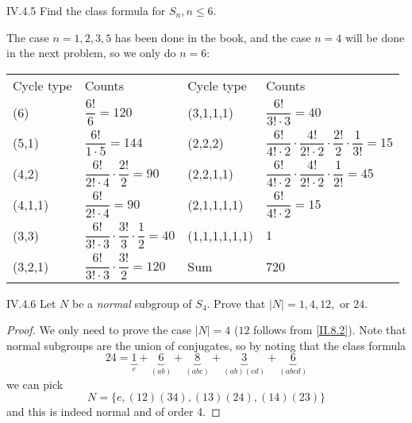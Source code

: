 \begin{problem}{IV.4.5}
Find the class formula for $S_n, n \leq 6$.
\end{problem}
\begin{solution}
The case $n = 1,2,3,5$ has been done in the book, and the case $n=4$ will be done in the next problem, so we only do $n = 6$:
\begin{center}
\begin{tabular}{l|l|l|l}
Cycle type & Counts &Cycle type & Counts \\
(6) & $\dfrac{6!}{6} = 120$ &(3,1,1,1) &$\dfrac{6!}{3! \cdot 3} = 40$ \\[8pt]
(5,1) &$\dfrac{6!}{1 \cdot 5} = 144$ & (2,2,2) &$\dfrac{6!}{4!\cdot 2} \cdot \dfrac{4!}{2!\cdot 2} \cdot \dfrac{2!}{2} \cdot \dfrac{1}{3!} = 15$ \\[8pt]
(4,2) &$\dfrac{6!}{2! \cdot 4} \cdot \dfrac{2!}{2} = 90$ &(2,2,1,1) &$\dfrac{6!}{4!\cdot 2} \cdot \dfrac{4!}{2!\cdot 2} \cdot \dfrac{1}{2!} = 45$ \\[8pt]
(4,1,1) &$\dfrac{6!}{2! \cdot 4} = 90$ &(2,1,1,1,1) &$\dfrac{6!}{4!\cdot 2} = 15$ \\[8pt]
(3,3) &$\dfrac{6!}{3! \cdot 3} \cdot \dfrac{3!}{3} \cdot \dfrac{1}{2} = 40$ &(1,1,1,1,1,1) &$1$ \\[8pt]
(3,2,1) &$\dfrac{6!}{3! \cdot 3} \cdot \dfrac{3!}{2} = 120$ &Sum &720

\end{tabular}	
\end{center}

\end{solution}

\begin{problem}{IV.4.6}
Let $N$ be a \emph{normal} subgroup of $S_4$. Prove that $|N| = 1,4,12,$ or $24$. 
\end{problem}
\begin{proof}
We only need to prove the case $|N|=4$ ($12$ follows from \ref{II.8.2}). Note that normal subgroups are the union of conjugates, so by noting that the class formula 
\[
24 = \underbrace{1}_e + \underbrace{6}_{(a b)} + \underbrace{8}_{(a b c)} + \underbrace{3}_{(a b)(c d)} + \underbrace{6}_{(a b c d)}
\]
we can pick
\[
N = \{e, (1 2)(3 4), (1 3)(2 4), (1 4)(2 3)\}	
\]
and this is indeed normal and of order 4.
\end{proof}


